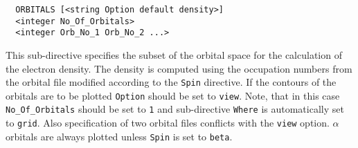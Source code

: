\begin{verbatim}
  ORBITALS [<string Option default density>]
  <integer No_Of_Orbitals>
  <integer Orb_No_1 Orb_No_2 ...>
\end{verbatim}

This sub-directive specifies the subset of the orbital space for the
calculation of the electron density. The density is computed using the
occupation numbers from the orbital file modified according to the
\verb+Spin+ directive. If the contours of the orbitals are to be plotted
\verb+Option+ should be set to \verb+view+. Note, that in this case
\verb+No_Of_Orbitals+ should be set to \verb+1+ and sub-directive
\verb+Where+ is automatically set to \verb+grid+. Also specification
of two orbital files conflicts with the \verb+view+ option.
$\alpha$ orbitals are always plotted unless \verb+Spin+ is set to
\verb+beta+.
